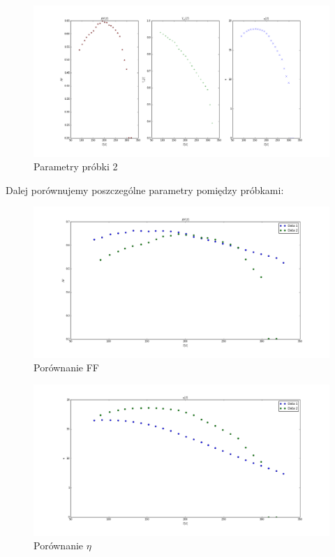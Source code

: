 \documentclass[a4paper,12pt]{article}
\begin{document}
\begin{figure} [H]
  \begin{center}
    \includegraphics[width = 15cm]{probka2_rozne.png}
    \caption{Parametry próbki 2}
  \end{center}
\end{figure}

Dalej porównujemy poszczególne parametry pomiędzy próbkami:

\begin{figure} [H]
  \begin{center}
    \includegraphics[width = 15cm]{probki_porownanie_FF.png}
    \caption{Porównanie FF}
  \end{center}
\end{figure}

\begin{figure} [H]
  \begin{center}
    \includegraphics[width = 15cm]{probki_porownanie_eta.png}
    \caption{Porównanie $\eta$}
  \end{center}
\end{figure}
\end{document}
